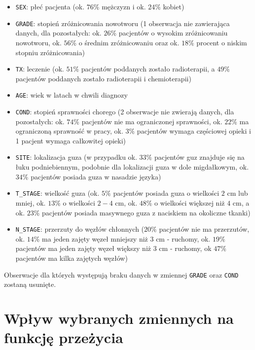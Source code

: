 \documentclass[
]{article}
\providecommand{\tightlist}{%
  \setlength{\itemsep}{0pt}\setlength{\parskip}{0pt}}
\begin{document}
\begin{itemize}
\tightlist
\item
  \texttt{SEX}: płeć pacjenta (ok. \(76\%\) mężczyzn i ok. \(24\%\)
  kobiet)
\item
  \texttt{GRADE}: stopień zróżnicowania nowotworu (1 obserwacja nie
  zawierająca danych, dla pozostałych: ok. \(26\%\) pacjentów o wysokim
  zróżnicowaniu nowotworu, ok. \(56\%\) o średnim zróżnicowaniu oraz ok.
  \(18\%\) procent o niskim stopniu zróżnicowania)
\item
  \texttt{TX}: leczenie (ok. \(51\%\) pacjentów poddanych zostało
  radioterapii, a \(49\%\) pacjentów poddanych zostało radioterapii i
  chemioterapii)
\item
  \texttt{AGE}: wiek w latach w chwili diagnozy
\item
  \texttt{COND}: stopień sprawności chorego (2 obserwacje nie zwierają
  danych, dla pozostałych: ok. \(74\%\) pacjentów nie ma ograniczonej
  sprawności, ok. \(22\%\) ma ograniczoną sprawność w pracy, ok. \(3\%\)
  pacjentów wymaga częściowej opieki i 1 pacjent wymaga całkowitej
  opieki)
\item
  \texttt{SITE}: lokalizacja guza (w przypadku ok. \(33\%\) pacjentów
  guz znajduje się na łuku podniebiennym, podobnie dla lokalizacji guza
  w dole migdałkowym, ok. \(34\%\) pacjentów posiada guza w nasadzie
  języka)
\item
  \texttt{T\_STAGE}: wielkość guza (ok. \(5\%\) pacjentów posiada guza o
  wielkości \(2\) cm lub mniej, ok. \(13\%\) o wielkości \(2-4\) cm, ok.
  \(48\%\) o wielkości większej niż \(4\) cm, a ok. \(23\%\) pacjentów
  posiada masywnego guza z naciskiem na okoliczne tkanki)
\item
  \texttt{N\_STAGE}: przerzuty do węzłów chłonnych (\(20\%\) pacjentów
  nie ma przerzutów, ok. \(14\%\) ma jeden zajęty węzeł mniejszy niż
  \(3\) cm - ruchomy, ok. \(19\%\) pacjentów ma jeden zajęty węzeł
  większy niż \(3\) cm - ruchomy, ok \(47\%\) pacjentów ma kilka
  zajętych węzłów)
\end{itemize}

Obserwacje dla których występują braku danych w zmiennej \texttt{GRADE}
oraz \texttt{COND} zostaną usunięte.

\hypertarget{wpux142yw-wybranych-zmiennych-na-funkcjux119-przeux17cycia}{%
\section{Wpływ wybranych zmiennych na funkcję
przeżycia}\label{wpux142yw-wybranych-zmiennych-na-funkcjux119-przeux17cycia}}
\end{document}
